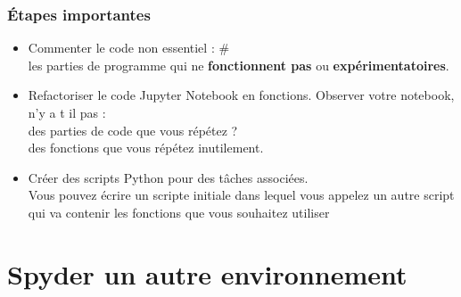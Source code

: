 \begin{frame}
 \frametitle{Étapes importantes}
\begin{itemize}
\item Commenter le code non essentiel : \# \\
 les parties de programme qui ne \textbf{fonctionnent pas} ou \textbf{expérimentatoires}.

\pause

\item Refactoriser le code Jupyter Notebook en fonctions. Observer votre notebook, n'y a t il pas :\\
 des parties de code que vous répétez ?\\
 des fonctions que vous répétez inutilement.

\pause

\item Créer des scripts Python pour des tâches associées.\\
 Vous pouvez écrire un scripte initiale dans lequel vous appelez un autre script qui va contenir les fonctions que vous souhaitez utiliser
\end{itemize} 
\end{frame}


\begin{frame}
 
\end{frame}



\begin{frame}
  
\end{frame}

\section{Spyder un autre environnement}
\begin{frame}
  
\end{frame}
\begin{frame}
  
\end{frame}
\begin{frame}
  
\end{frame}
\begin{frame}
  
\end{frame}
\begin{frame}
  
\end{frame}

